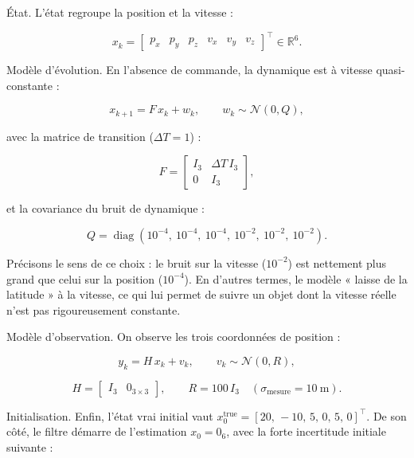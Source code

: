 \documentclass[11pt]{article}
\theoremstyle{remark}
\theoremstyle{definition}
\begin{document}
État. L'état regroupe la position et la vitesse :

\begin{equation}
x_k = \begin{bmatrix} p_x & p_y & p_z & v_x & v_y & v_z \end{bmatrix}^\top \in \mathbb{R}^6 .
\end{equation}

Modèle d'évolution. En l'absence de commande, la dynamique est à vitesse
quasi-constante :

\begin{equation}
x_{k+1} = F\, x_k + w_k,
\qquad
w_k \sim \mathcal{N}(0, Q),
\end{equation}

avec la matrice de transition ($\Delta T = 1$) :

\begin{equation}
F =
\begin{bmatrix}
I_3 & \Delta T\,I_3 \\[2pt]
0 & I_3
\end{bmatrix},
\end{equation}

et la covariance du bruit de dynamique :

\begin{equation}
Q = \operatorname{diag}(10^{-4},\ 10^{-4},\ 10^{-4},\ 10^{-2},\ 10^{-2},\ 10^{-2}).
\end{equation}

Précisons le sens de ce choix : le bruit sur la vitesse ($10^{-2}$) est nettement plus grand
que celui sur la position ($10^{-4}$). En d'autres termes, le modèle « laisse de la latitude »
à la vitesse, ce qui lui permet de suivre un objet dont la vitesse réelle n'est pas
rigoureusement constante.

Modèle d'observation. On observe les trois coordonnées de position :

\begin{equation}
y_k = H\, x_k + v_k,
\qquad
v_k \sim \mathcal{N}(0, R),
\end{equation}

\begin{equation}
H =
\begin{bmatrix}
I_3 & 0_{3\times 3}
\end{bmatrix},
\qquad
R = 100\,I_3
\quad (\sigma_{\text{mesure}} = 10\ \text{m}).
\end{equation}

Initialisation. Enfin, l'état vrai initial vaut
$x_0^{\text{true}} = [20,\,-10,\,5,\,0,\,5,\,0]^\top$. De son côté, le filtre démarre de
l'estimation $x_0 = 0_6$, avec la forte incertitude initiale suivante :
\end{document}
